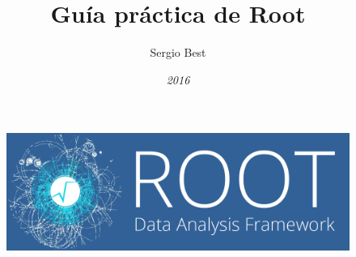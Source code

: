 \documentclass{article}
\title{\bf{Gu\'ia pr\'actica de Root}}
\author{Sergio Best}
\date{\it{2016}}
\begin{document}
    \begin{figure}
    \begin{center}
    \includegraphics[scale=0.25]{logo.png}
    \end{center}
    \end{figure}
\maketitle
\end{document}
